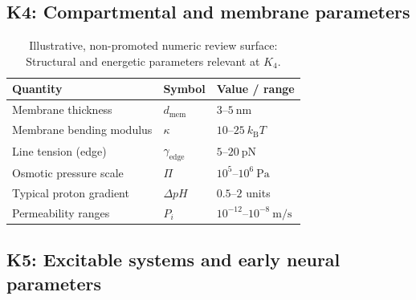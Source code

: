 
\subsection*{K4: Compartmental and membrane parameters}

\begin{table}[h]
  \centering
  \caption{Illustrative, non-promoted numeric review surface: Structural and energetic parameters relevant at \(K_4\).}
  \label{tab:k4-membrane-parameters}
  \begin{tabular}{lll}
    \hline
    Quantity & Symbol & Value / range \\
    \hline
    Membrane thickness & \(d_\mathrm{mem}\)
        & \(3\text{–}5~\mathrm{nm}\) \\
    Membrane bending modulus & \(\kappa\)
        & \(10\text{–}25~k_\mathrm{B}T\) \\
    Line tension (edge) & \(\gamma_\mathrm{edge}\)
        & \(5\text{–}20~\mathrm{pN}\) \\
    Osmotic pressure scale & \(\Pi\)
        & \(10^5\text{–}10^6~\mathrm{Pa}\) \\
    Typical proton gradient & \(\Delta pH\)
        & \(0.5\text{–}2\) units \\
    Permeability ranges & \(P_i\)
        & \(10^{-12}\text{–}10^{-8}~\mathrm{m/s}\) \\
    \hline
  \end{tabular}
\end{table}


\subsection*{K5: Excitable systems and early neural parameters}


